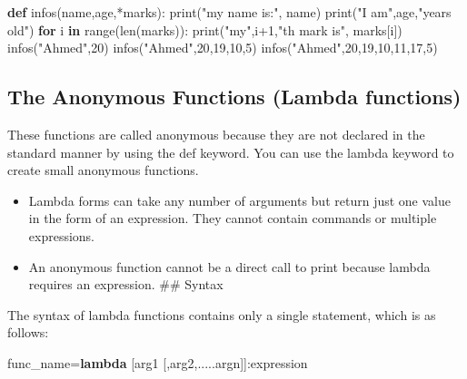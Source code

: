 \documentclass[11pt]{article}
\providecommand{\tightlist}{%
      \setlength{\itemsep}{0pt}\setlength{\parskip}{0pt}}
\newenvironment{Shaded}{}{}
\newcommand{\KeywordTok}[1]{\textcolor[rgb]{0.00,0.44,0.13}{\textbf{{#1}}}}
\newcommand{\DecValTok}[1]{\textcolor[rgb]{0.25,0.63,0.44}{{#1}}}
\newcommand{\StringTok}[1]{\textcolor[rgb]{0.25,0.44,0.63}{{#1}}}
\newcommand{\NormalTok}[1]{{#1}}
\newcommand{\ControlFlowTok}[1]{\textcolor[rgb]{0.00,0.44,0.13}{\textbf{{#1}}}}
\newcommand{\OperatorTok}[1]{\textcolor[rgb]{0.40,0.40,0.40}{{#1}}}
\newcommand{\BuiltInTok}[1]{{#1}}
\begin{document}
\begin{Shaded}
\begin{Highlighting}[]
    \KeywordTok{def}\NormalTok{ infos(name,age,}\OperatorTok{*}\NormalTok{marks):}
        \BuiltInTok{print}\NormalTok{(}\StringTok{"my name is:"}\NormalTok{, name)}
        \BuiltInTok{print}\NormalTok{(}\StringTok{"I am"}\NormalTok{,age,}\StringTok{"years old"}\NormalTok{)}
        \ControlFlowTok{for}\NormalTok{ i }\KeywordTok{in} \BuiltInTok{range}\NormalTok{(}\BuiltInTok{len}\NormalTok{(marks)):}
            \BuiltInTok{print}\NormalTok{(}\StringTok{"my"}\NormalTok{,i}\OperatorTok{+}\DecValTok{1}\NormalTok{,}\StringTok{"th mark is"}\NormalTok{, marks[i])}
\NormalTok{    infos(}\StringTok{"Ahmed"}\NormalTok{,}\DecValTok{20}\NormalTok{)}
\NormalTok{    infos(}\StringTok{"Ahmed"}\NormalTok{,}\DecValTok{20}\NormalTok{,}\DecValTok{19}\NormalTok{,}\DecValTok{10}\NormalTok{,}\DecValTok{5}\NormalTok{)}
\NormalTok{    infos(}\StringTok{"Ahmed"}\NormalTok{,}\DecValTok{20}\NormalTok{,}\DecValTok{19}\NormalTok{,}\DecValTok{10}\NormalTok{,}\DecValTok{11}\NormalTok{,}\DecValTok{17}\NormalTok{,}\DecValTok{5}\NormalTok{)}
\end{Highlighting}
\end{Shaded}

\hypertarget{the-anonymous-functions-lambda-functions}{%
\subsection{The Anonymous Functions (Lambda
functions)}\label{the-anonymous-functions-lambda-functions}}

These functions are called anonymous because they are not declared in
the standard manner by using the def keyword. You can use the lambda
keyword to create small anonymous functions.

\begin{itemize}
\tightlist
\item
  Lambda forms can take any number of arguments but return just one
  value in the form of an expression. They cannot contain commands or
  multiple expressions.
\item
  An anonymous function cannot be a direct call to print because lambda
  requires an expression. \#\# Syntax
\end{itemize}

The syntax of lambda functions contains only a single statement, which
is as follows:

\begin{Shaded}
\begin{Highlighting}[]
\NormalTok{func\_name}\OperatorTok{=}\KeywordTok{lambda}\NormalTok{ [arg1 [,arg2,.....argn]]:expression}
\end{Highlighting}
\end{Shaded}
\end{document}
